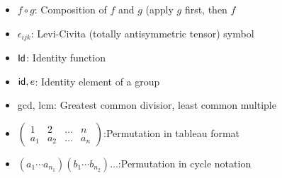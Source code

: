 \begin{itemize}
\item[]
$f \circ g$: \quad Composition of $f$ and $g$ (apply $g$ first, then $f$
\item[]
$\epsilon_{ijk}$: \quad Levi-Civita (totally antisymmetric tensor) symbol
\item[]
${\sf{I}d}$: \quad Identity function
\item[]
${\sf{i}d}, e$: \quad Identity element of a group
\item[]
gcd, lcm: \quad Greatest common divisior, least common multiple
\item[]
$\begin{pmatrix} 1 & 2 & \ldots & n\\ a_1 & a_2 & \ldots & a_n \end{pmatrix}$:\quad Permutation in tableau format
\item[]
$(a_1 \cdots a_{n_1})(b_1 \cdots b_{n_2}) \ldots $:\quad Permutation in cycle notation
\end{itemize}